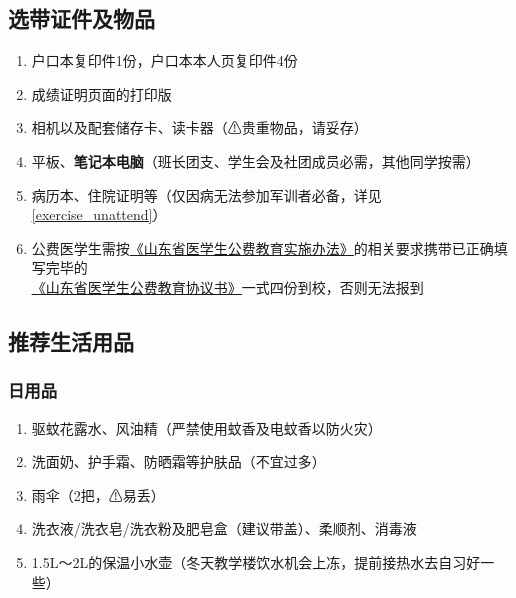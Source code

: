 \subsection[选带证件及物品]{选带证件及物品}
\begin{enumerate}
    \item 户口本复印件1份，户口本本人页复印件4份\footnotemark
    \item 成绩证明页面的打印版\footnotemark
    \item 相机以及配套储存卡、读卡器（⚠贵重物品，请妥存）
    \item 平板\footnotemark、\textbf{笔记本电脑}（班长团支、学生会及社团成员必需，其他同学按需）
    \item 病历本、住院证明等（仅因病无法参加军训者必备，详见\uline{\ref{exercise_unattend}}）
    \item 公费医学生需按\uline{\href{http://www.shandong.gov.cn/art/2021/10/14/art_100623_39304.html}{《山东省医学生公费教育实施办法》}}的相关要求携带已正确填写完毕的\\%
          \uline{\href{http://app.shandong.gov.cn/attach/2021/28/60-1.pdf}{《山东省医学生公费教育协议书》}}一式四份到校，否则无法报到\footnotemark
\end{enumerate}

\subsection[推荐生活用品]{推荐生活用品}

\subsubsection[日用品]{日用品}
\begin{enumerate}
    \item 驱蚊花露水、风油精（严禁使用蚊香及电蚊香以防火灾）
    \item 洗面奶、护手霜、防晒霜等护肤品（不宜过多）
    \item 雨伞（2把，⚠易丢）
    \item 洗衣液/洗衣皂/洗衣粉及肥皂盒（建议带盖）、柔顺剂、消毒液
    \item 1.5L～2L的保温小水壶（冬天教学楼饮水机会上冻，提前接热水去自习好一些）
\end{enumerate}

